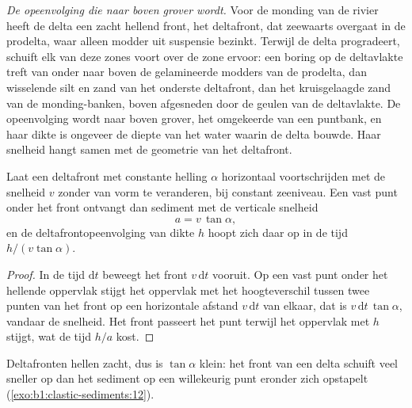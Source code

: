 \emph{De opeenvolging die naar boven grover wordt.} Voor de monding van de rivier heeft de delta een zacht hellend front, het deltafront, dat zeewaarts overgaat in de prodelta, waar alleen modder uit suspensie bezinkt. Terwijl de delta progradeert, schuift elk van deze zones voort over de zone ervoor: een boring op de deltavlakte treft van onder naar boven de gelamineerde modders van de prodelta, dan wisselende silt en zand van het onderste deltafront, dan het kruisgelaagde zand van de monding-banken, boven afgesneden door de geulen van de deltavlakte. De opeenvolging wordt naar boven grover, het omgekeerde van een puntbank, en haar dikte is ongeveer de diepte van het water waarin de delta bouwde. Haar snelheid hangt samen met de geometrie van het deltafront.

\begin{proposition}\label{prop:b1:clastic-sediments:progradation}
Laat een deltafront met constante helling $\alpha$ horizontaal voortschrijden met de snelheid $v$ zonder van vorm te veranderen, bij constant zeeniveau. Een vast punt onder het front ontvangt dan sediment met de verticale snelheid
\[
  a = v\,\tan\alpha,
\]
en de deltafrontopeenvolging van dikte $h$ hoopt zich daar op in de tijd $h/(v\tan\alpha)$.
\end{proposition}

\begin{proof}
In de tijd $\mathrm dt$ beweegt het front $v\,\mathrm dt$ vooruit. Op een vast punt onder het hellende oppervlak stijgt het oppervlak met het hoogteverschil tussen twee punten van het front op een horizontale afstand $v\,\mathrm dt$ van elkaar, dat is $v\,\mathrm dt\,\tan\alpha$, vandaar de snelheid. Het front passeert het punt terwijl het oppervlak met $h$ stijgt, wat de tijd $h/a$ kost.
\end{proof}

Deltafronten hellen zacht, dus is $\tan\alpha$ klein: het front van een delta schuift veel sneller op dan het sediment op een willekeurig punt eronder zich opstapelt (\cref{exo:b1:clastic-sediments:12}).

